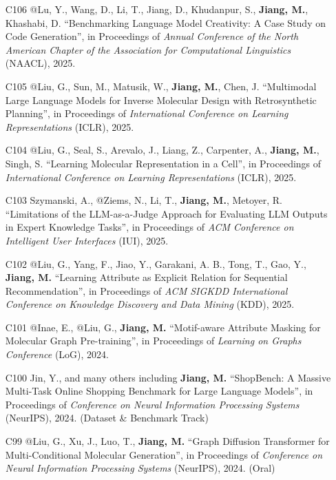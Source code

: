 \documentclass[10pt]{article}
\newenvironment{myindentpar}[1]%
{\begin{list}{}%
         {\setlength{\leftmargin}{#1}}%
         \item[]%
}
{\end{list}}
\newcounter{list}
\begin{document}
\begin{myindentpar}{0.00cm}
\begin{enumerate}[leftmargin=.5cm]
\item[C106] @Lu, Y., Wang, D., Li, T., Jiang, D., Khudanpur, S., \textbf{Jiang, M.}, Khashabi, D. ``Benchmarking Language Model Creativity: A Case Study on Code Generation'', in Proceedings of \textit{Annual Conference of the North American Chapter of the Association for Computational Linguistics} (NAACL), 2025.

\item[C105] @Liu, G., Sun, M., Matusik, W., \textbf{Jiang, M.}, Chen, J. ``Multimodal Large Language Models for Inverse Molecular Design with Retrosynthetic Planning'', in Proceedings of \textit{International Conference on Learning Representations} (ICLR), 2025.

\item[C104] @Liu, G., Seal, S., Arevalo, J., Liang, Z., Carpenter, A., \textbf{Jiang, M.}, Singh, S. ``Learning Molecular Representation in a Cell'', in Proceedings of \textit{International Conference on Learning Representations} (ICLR), 2025.
		
\item[C103] Szymanski, A., @Ziems, N., Li, T., \textbf{Jiang, M.}, Metoyer, R. ``Limitations of the LLM-as-a-Judge Approach for Evaluating LLM Outputs in Expert Knowledge Tasks'', in Proceedings of \textit{ACM Conference on Intelligent User Interfaces} (IUI), 2025.

\item[C102] @Liu, G., Yang, F., Jiao, Y., Garakani, A. B., Tong, T., Gao, Y., \textbf{Jiang, M.} ``Learning Attribute as Explicit Relation for Sequential Recommendation'', in Proceedings of \textit{ACM SIGKDD International Conference on Knowledge Discovery and Data Mining} (KDD), 2025.
		
\item[C101] @Inae, E., @Liu, G., \textbf{Jiang, M.} ``Motif-aware Attribute Masking for Molecular Graph Pre-training'', in Proceedings of \textit{Learning on Graphs Conference} (LoG), 2024.
		
\item[C100] Jin, Y., and many others including \textbf{Jiang, M.} ``ShopBench: A Massive Multi-Task Online Shopping Benchmark for Large Language Models'', in Proceedings of \textit{Conference on Neural Information Processing Systems} (NeurIPS), 2024. (Dataset \& Benchmark Track)

\item[C99] @Liu, G., Xu, J., Luo, T., \textbf{Jiang, M.} ``Graph Diffusion Transformer for Multi-Conditional Molecular Generation'', in Proceedings of \textit{Conference on Neural Information Processing Systems} (NeurIPS), 2024. (Oral)


\end{enumerate}
\end{myindentpar}
\end{document}
